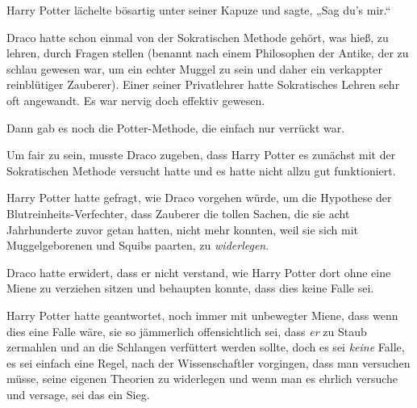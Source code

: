 Harry Potter lächelte bösartig unter seiner Kapuze und sagte, „Sag du’s mir.“

\later

Draco hatte schon einmal von der Sokratischen Methode gehört, was hieß, zu lehren, durch Fragen stellen (benannt nach einem Philosophen der Antike, der zu schlau gewesen war, um ein echter Muggel zu sein und daher ein verkappter reinblütiger Zauberer). Einer seiner Privatlehrer hatte Sokratisches Lehren sehr oft angewandt. Es war nervig doch effektiv gewesen.

Dann gab es noch die Potter-Methode, die einfach nur verrückt war.

Um fair zu sein, musste Draco zugeben, dass Harry Potter es zunächst mit der Sokratischen Methode versucht hatte und es hatte nicht allzu gut funktioniert.

Harry Potter hatte gefragt, wie Draco vorgehen würde, um die Hypothese der Blutreinheits-Verfechter, dass Zauberer die tollen Sachen, die sie acht Jahrhunderte zuvor getan hatten, nicht mehr konnten, weil sie sich mit Muggelgeborenen und Squibs paarten, zu \emph{widerlegen}.

Draco hatte erwidert, dass er nicht verstand, wie Harry Potter dort ohne eine Miene zu verziehen sitzen und behaupten konnte, dass dies keine Falle sei.

Harry Potter hatte geantwortet, noch immer mit unbewegter Miene, dass wenn dies eine Falle wäre, sie so jämmerlich offensichtlich sei, dass \emph{er} zu Staub zermahlen und an die Schlangen verfüttert werden sollte, doch es sei \emph{keine} Falle, es sei einfach eine Regel, nach der Wissenschaftler vorgingen, dass man versuchen müsse, seine eigenen Theorien zu widerlegen und wenn man es ehrlich versuche und versage, sei das ein Sieg.

